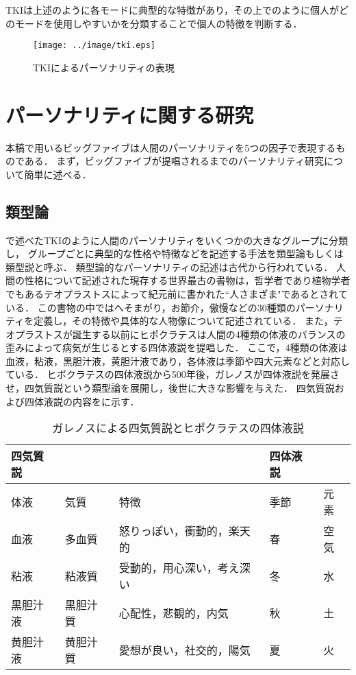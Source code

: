 TKIは上述のように各モードに典型的な特徴があり，その上でのように個人がどのモードを使用しやすいかを分類することで個人の特徴を判断する．
\begin{figure}[tb]
    \centering
    \texttt{[image: ../image/tki.eps]}
    \caption{TKIによるパーソナリティの表現}
    \label{fig:tki}
\end{figure}

\section{パーソナリティに関する研究}
\label{sec:personality}
本稿で用いるビッグファイブは人間のパーソナリティを5つの因子で表現するものである．
まず，ビッグファイブが提唱されるまでのパーソナリティ研究について簡単に述べる\cite{big5-history, psychology, first-personality,daniel}．

\subsection{類型論}
で述べたTKIのように人間のパーソナリティをいくつかの大きなグループに分類し，
グループごとに典型的な性格や特徴などを記述する手法を類型論もしくは類型説と呼ぶ．
類型論的なパーソナリティの記述は古代から行われている．
人間の性格について記述された現存する世界最古の書物は，哲学者であり植物学者でもあるテオプラストスによって紀元前に書かれた“人さまざま"であるとされている．
この書物の中ではへそまがり，お節介，傲慢などの30種類のパーソナリティを定義し，その特徴や具体的な人物像について記述されている\cite{theophrastus}．
また，テオプラストスが誕生する以前にヒポクラテスは人間の4種類の体液のバランスの歪みによって病気が生じるとする四体液説を提唱した\cite{hippocrates}．
ここで，4種類の体液は血液，粘液，黒胆汁液，黄胆汁液であり，各体液は季節や四大元素などと対応している．
ヒポクラテスの四体液説から500年後，ガレノスが四体液説を発展させ，四気質説という類型論を展開し，後世に大きな影響を与えた\cite{smith}．
四気質説および四体液説の内容をに示す．

\begin{table}[tb]
    \centering
    \caption[ガレノスによる四気質説とヒポクラテスの四体液説]{ガレノスによる四気質説とヒポクラテスの四体液説 \protect \footnotemark}
    \begin{tabular}{lllll} \toprule
        四気質説 & & & 四体液説 & \\ \midrule
        体液 & 気質 & 特徴 & 季節 & 元素\\ \midrule
        血液 & 多血質 & 怒りっぽい，衝動的，楽天的 & 春 & 空気 \\
        粘液 & 粘液質 & 受動的，用心深い，考え深い & 冬 & 水 \\
        黒胆汁液 & 黒胆汁質 & 心配性，悲観的，内気 & 秋 & 土 \\
        黄胆汁液 & 黄胆汁質 & 愛想が良い，社交的，陽気 & 夏 & 火 \\ \bottomrule
    \end{tabular}
    \label{tab:galenos}
\end{table}

